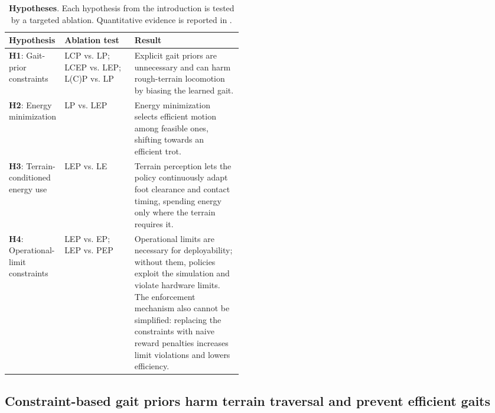 \documentclass{article}
\newcommand{\baselineOne}{LCP}
\newcommand{\baselineTwo}{LP}
\newcommand{\baselineThree}{LCEP}
\newcommand{\baselineFour}{LEP}
\newcommand{\baselineSix}{EP}
\newcommand{\baselineFourBlind}{LE}
\begin{document}
    \begin{table}[t]
        \centering
        \footnotesize
        \caption{\textbf{Hypotheses}. Each hypothesis from the introduction is tested by a targeted ablation. Quantitative evidence is reported in .}
        \label{tab:diagnostic-summary}
        \setlength{\tabcolsep}{4pt}
        \renewcommand{\arraystretch}{1.10}
        \begin{tabularx}{\linewidth}{@{}L{0.16\linewidth}L{0.30\linewidth}Y@{}}
            \toprule
            \textbf{Hypothesis} & \textbf{Ablation test} & \textbf{Result} \\
            \midrule
            \textbf{H1}: Gait-prior constraints
            & \baselineOne{} vs. \baselineTwo{}; \baselineThree{} vs. \baselineFour{}; L(C)P vs. \baselineTwo{}
            & Explicit gait priors are unnecessary and can harm rough-terrain locomotion by biasing the learned gait. \\
            \midrule
            \textbf{H2}: Energy minimization
            & \baselineTwo{} vs. \baselineFour{}
            & Energy minimization selects efficient motion among feasible ones, shifting towards an efficient trot.\\
            \midrule
            \textbf{H3}: Terrain-conditioned energy use
            & \baselineFour{} vs. \baselineFourBlind{}
            & Terrain perception lets the policy continuously adapt foot clearance and contact timing, spending energy only where the terrain requires it.\\
            \midrule
            \textbf{H4}: Operational-limit constraints
            & \baselineFour{} vs. \baselineSix{}; \baselineFour{} vs. PEP
            & Operational limits are necessary for deployability; without them, policies exploit the simulation and violate hardware limits. The enforcement mechanism also cannot be simplified: replacing the constraints with naive reward penalties increases limit violations and lowers efficiency. \\
            \bottomrule
        \end{tabularx}
    \end{table}
    
    \subsection{Constraint-based gait priors harm terrain traversal and prevent efficient gaits}
    \label{sec:results-style}
    
\end{document}
